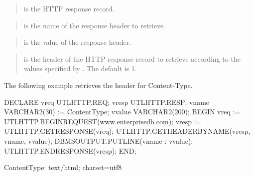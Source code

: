 \documentclass[letterpaper,10pt,english,openany,oneside]{sphinxmanual}
\begin{document}

\begin{quote}

 is the HTTP response record.
\end{quote}

\begin{quote}

 is the name of the response header to retrieve.
\end{quote}

\begin{quote}

 is the value of the response header.
\end{quote}

\begin{quote}

 is the  header of the HTTP response record to retrieve
according to the values specified by . The default is 1.
\end{quote}


The following example retrieves the header for Content-Type.

%
\begin{sphinxVerbatim}[commandchars=\\\{\}]
DECLARE
    v\PYGZus{}req           UTL\PYGZus{}HTTP.REQ;
    v\PYGZus{}resp          UTL\PYGZus{}HTTP.RESP;
    v\PYGZus{}name          VARCHAR2(30) := \PYGZsq{}Content\PYGZhy{}Type\PYGZsq{};
    v\PYGZus{}value         VARCHAR2(200);
BEGIN
    v\PYGZus{}req := UTL\PYGZus{}HTTP.BEGIN\PYGZus{}REQUEST(\PYGZsq{}www.enterprisedb.com\PYGZsq{});
    v\PYGZus{}resp := UTL\PYGZus{}HTTP.GET\PYGZus{}RESPONSE(v\PYGZus{}req);
    UTL\PYGZus{}HTTP.GET\PYGZus{}HEADER\PYGZus{}BY\PYGZus{}NAME(v\PYGZus{}resp, v\PYGZus{}name, v\PYGZus{}value);
    DBMS\PYGZus{}OUTPUT.PUT\PYGZus{}LINE(v\PYGZus{}name \textbar{}\textbar{} \PYGZsq{}: \PYGZsq{} \textbar{}\textbar{} v\PYGZus{}value);
    UTL\PYGZus{}HTTP.END\PYGZus{}RESPONSE(v\PYGZus{}resp);
END;

Content\PYGZhy{}Type: text/html; charset=utf\PYGZhy{}8
\end{sphinxVerbatim}
\end{document}

